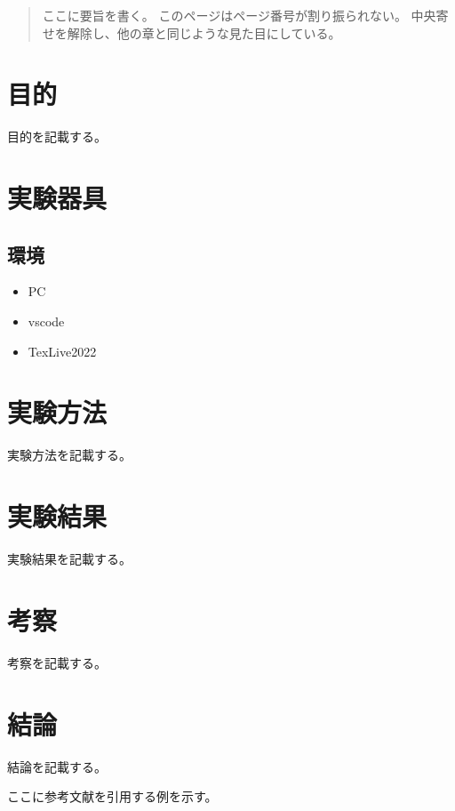 \documentclass[titlepage]{jlreq}
\begin{document}
\begin{abstract}

ここに要旨を書く。
このページはページ番号が割り振られない。
中央寄せを解除し、他の章と同じような見た目にしている。

\end{abstract} 


\section{目的}

目的を記載する。

\section{実験器具}

\subsection{環境}

\begin{itemize}
    \item PC
    \item vscode
    \item TexLive2022
  \end{itemize}

\section{実験方法}

実験方法を記載する。

\section{実験結果}

実験結果を記載する。

\section{考察}

考察を記載する。


\section{結論}

結論を記載する。

ここに参考文献を引用する例を示す。

\cite{hon2}
\end{document}
